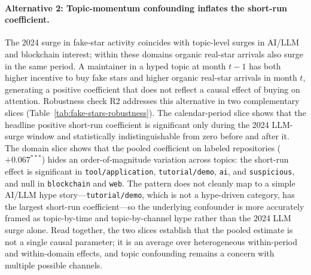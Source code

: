 \paragraph{Alternative 2: Topic-momentum confounding inflates the short-run coefficient.}
The 2024 surge in fake-star activity coincides with topic-level surges in AI/LLM and blockchain interest; within these domains organic real-star arrivals also surge in the same period.
A maintainer in a hyped topic at month $t-1$ has both higher incentive to buy fake stars and higher organic real-star arrivals in month $t$, generating a positive coefficient that does not reflect a causal effect of buying on attention.
Robustness check R2 addresses this alternative in two complementary slices (Table~\ref{tab:fake-stars-robustness}).
The calendar-period slice shows that the headline positive short-run coefficient is significant only during the 2024 LLM-surge window and statistically indistinguishable from zero before and after it.
The domain slice shows that the pooled coefficient on labeled repositories ($+0.067^{***}$) hides an order-of-magnitude variation across topics: the short-run effect is significant in \texttt{tool/application}, \texttt{tutorial/demo}, \texttt{ai}, and \texttt{suspicious}, and null in \texttt{blockchain} and \texttt{web}.
The pattern does not cleanly map to a simple AI/LLM hype story---\texttt{tutorial/demo}, which is not a hype-driven category, has the largest short-run coefficient---so the underlying confounder is more accurately framed as topic-by-time and topic-by-channel hype rather than the 2024 LLM surge alone.
Read together, the two slices establish that the pooled estimate is not a single causal parameter; it is an average over heterogeneous within-period and within-domain effects, and topic confounding remains a concern with multiple possible channels.

